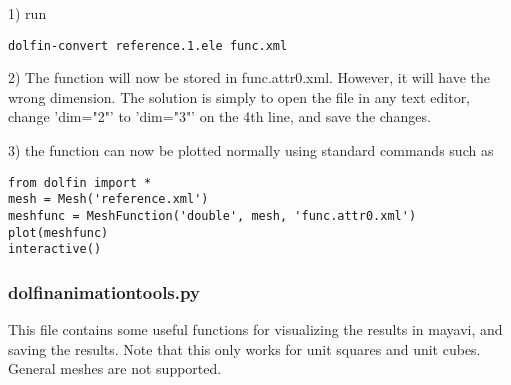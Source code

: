 1) run
\begin{verbatim}
dolfin-convert reference.1.ele func.xml
\end{verbatim}
2) The function will now be stored in func.attr0.xml. However, it will have the wrong dimension. The solution is simply to open the file in any text editor, change 'dim="2"' to 'dim="3"' on the 4th line, and save the changes. 

3) the function can now be plotted normally using standard commands such as 
\begin{lstlisting}
from dolfin import *
mesh = Mesh('reference.xml')
meshfunc = MeshFunction('double', mesh, 'func.attr0.xml')
plot(meshfunc)
interactive()
\end{lstlisting}


\subsubsection{dolfin\textunderscore animation\textunderscore tools.py}
This file contains some useful functions for visualizing the results in mayavi, and saving the results. Note that this only works for unit squares and unit cubes. General meshes are not supported. 

